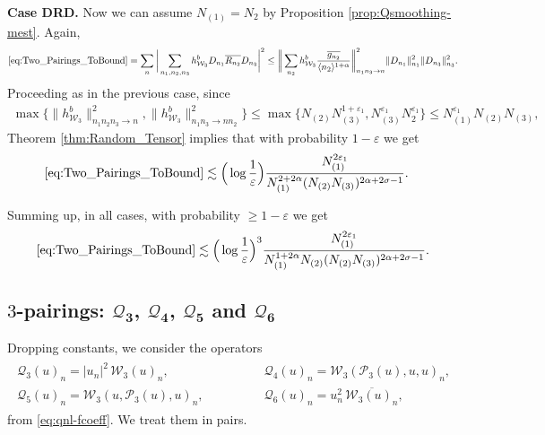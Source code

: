 \documentclass[11pt, xcolor = dvipsnames,reqno
]{amsart}
\theoremstyle{definition}
\theoremstyle{remark}
\begin{document}
\noindent\textbf{Case DRD. }  Now we can assume $N_{(1)} = N_2$ by Proposition \ref{prop:Qsmoothing-mest}. Again,
    \begin{align}\label{eq:DRD_With_RT}
        \eqref{eq:Two_Pairings_ToBound}
        = \sum_n \bigg| \sum_{n_1,n_2,n_3} h^b_{\mathcal{W}_3} D_{n_1} \overline{R_{n_2}} D_{n_3} \bigg|^2
        \leq  \bigg\| \sum_{n_2}  h^b_{\mathcal{W}_3} \frac{\overline{g_{n_2}}}{\langle n_2 \rangle^{1 + \alpha}} \bigg\|_{n_1n_3 \rightarrow n}^2 \| D_{n_1} \|_{n_1}^2 \| D_{n_3} \|_{n_3}^2. 
    \end{align}
    Proceeding as in the previous case, since
    \begin{align}
        \max \{ \lVert h^b_{\mathcal{W}_3} \rVert_{n_1n_2n_3 \to n}^2, 
        \lVert h^b_{\mathcal{W}_3} \rVert_{n_1n_3 \to nn_2}^2 \}
        \leq 
        \max\{ N_{(2)}N_{(3)}^{1+\varepsilon_1}, N_{(3)}^{\varepsilon_1} N_2^{\varepsilon_1} \}
        \leq N_{(1)}^{\varepsilon_1} N_{(2)} N_{(3)}, 
    \end{align}
    Theorem \ref{thm:Random_Tensor} implies that with probability $1 - \varepsilon$ we get
    \begin{align*}
        \eqref{eq:Two_Pairings_ToBound}
        & \lesssim 
        \Big(\log \frac{1}{\varepsilon} \Big) \frac{N_{(1)}^{2\varepsilon_1}}{N_{(1)}^{2 + 2\alpha} (N_{(2)} N_{(3)})^{2\alpha + 2\sigma - 1}}.
    \end{align*}
    
Summing up, in all cases, 
with probability $\geq 1-\varepsilon$ we get
    \begin{equation}\label{eq:Bound_Cubic_Wick_Ordered}
    \eqref{eq:Two_Pairings_ToBound}
        \lesssim \Big(\log \frac{1}{\varepsilon} \Big)^3 \frac{N_{(1)}^{2\varepsilon_1}}{ N_{(1)}^{1+2\alpha} N_{(2)}  (N_{(2)} N_{(3)})^{2\alpha + 2\sigma - 1}}.
    \end{equation}

    \subsection{$3$-pairings: $\boldsymbol{\mathcal{Q}_3}$, $\boldsymbol{\mathcal{Q}_4}$, $\boldsymbol{\mathcal{Q}_5}$ and $\boldsymbol{\mathcal{Q}_6}$}\label{sec:smoothing-3pairings}
    Dropping constants, we consider the operators 
    \begin{align}\label{eq:Qj-2pairing}
    \begin{array}{ll}
       \mathcal{Q}_3(u)_n = 
     |u_n|^2 \, \mathcal W_3(u)_n,  & 
    \qquad \qquad \mathcal{Q}_4(u)_n = \mathcal W_3(\mathcal P_3(u),u,u)_n, \\
       \mathcal{Q}_5(u)_n = \mathcal W_3(u,\mathcal P_3(u),u)_n,  & \qquad \qquad \mathcal{Q}_6(u)_n = u_n^2 \, \overline{\mathcal W_3(u)_n}, 
    \end{array}
    \end{align}
    from \eqref{eq:qnl-fcoeff}. 
    We treat them in pairs. 
    
\end{document}
